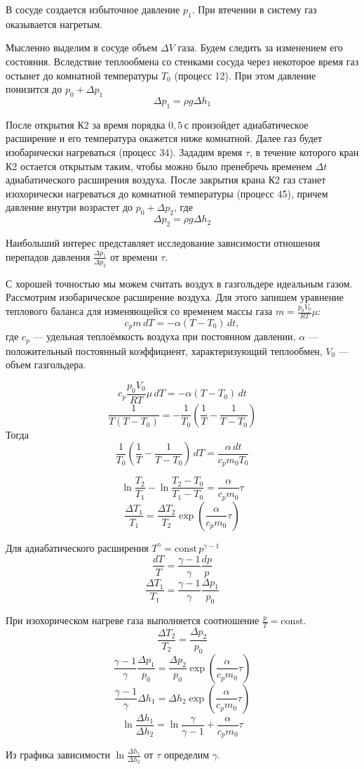 В сосуде создается избыточное давление $p_1$. При втечении в систему газ оказывается нагретым.

Мысленно выделим в сосуде объем $\Delta V$ газа. Будем следить за изменением его состояния.
Вследствие теплообмена со стенками сосуда через некоторое время газ остынет до комнатной температуры
$T_0$ (процесс 12). При этом давление понизится до $p_0 + \Delta p_1$
\[\Delta p_1 = \rho g\Delta h_1\]

После открытия К2 за время порядка $0{,}5\,\text{с}$ произойдет адиабатическое расширение
и его температура окажется ниже комнатной. Далее газ будет изобарически нагреваться (процесс 34).
Зададим время $\tau$, в течение которого кран К2 остается открытым таким, чтобы можно было
пренебречь временем $\Delta t$ адиабатического расширения воздуха. После закрытия крана К2
газ станет изохорически нагреваться до комнатной температуры (процесс 45), причем давление
внутри возрастет до $p_0 + \Delta p_2$, где 
\[\Delta p_2 = \rho g\Delta h_2\] 

Наибольший интерес представляет исследование зависимости отношения перепадов давления
$\frac{\Delta p_1}{\Delta p_2}$ от времени $\tau$.

С хорошей точностью мы можем считать воздух в газгольдере идеальным газом.
Рассмотрим изобарическое расширение воздуха. Для этого запишем уравнение теплового баланса
для изменяющейся со временем массы газа $m=\frac{p_0V_0}{RT}\mu$:
\[c_pm\,dT=-\alpha(T-T_0)\,dt,\]
где $c_p$ --- удельная теплоёмкость воздуха при постоянном давлении, $\alpha$ ---
положительный постоянный коэффициент, характеризующий теплообмен, $V_0$ --- объем газгольдера.

\[c_p\frac{p_0V_0}{RT}\mu\,dT = -\alpha (T-T_0)\,dt\]
\[\frac{1}{T(T-T_0)}=-\frac{1}{T_0}\left(\frac{1}{T}-\frac{1}{T-T_0}\right)\]
Тогда
\[\frac{1}{T_0}\left(\frac{1}{T} - \frac{1}{T-T_0}\right)\, dT = \frac{\alpha\, dt}{c_pm_0T_0}\]

\[\ln\frac{T_2}{T_1} - \ln\frac{T_2-T_0}{T_1-T_0}=\frac{\alpha}{c_pm_0}\tau\]
\[\frac{\Delta T_1}{T_1} = \frac{\Delta T_2}{T_2}\exp\left(\frac{\alpha}{c_pm_0}\tau\right)\]

Для адиабатического расширения $T^\gamma = \mathrm{const}\,p^{\gamma-1}$
\[\frac{dT}{T}=\frac{\gamma-1}{\gamma}\frac{dp}{p}\]
\[\frac{\Delta T_1}{T_1}=\frac{\gamma-1}{\gamma}\frac{\Delta p_1}{p_0}\]

При изохорическом нагреве газа выполняется соотношение $\frac{p}{T}=\mathrm{const}$.
\[\frac{\Delta T_2}{T_2}=\frac{\Delta p_2}{p_0}\]
\[\frac{\gamma-1}{\gamma}\frac{\Delta p_1}{p_0} = \frac{\Delta p_2}{p_0}\exp\left(\frac{\alpha}{c_pm_0}\tau\right)\]
\[\frac{\gamma-1}{\gamma}\Delta h_1 = \Delta h_2\exp\left(\frac{\alpha}{c_pm_0}\tau\right)\]
\[\ln\frac{\Delta h_1}{\Delta h_2} = \ln\frac{\gamma}{\gamma-1} + \frac{\alpha}{c_pm_0}\tau\]

Из графика зависимости $\ln\frac{\Delta h_1}{\Delta h_2}$ от $\tau$ определим $\gamma$.

